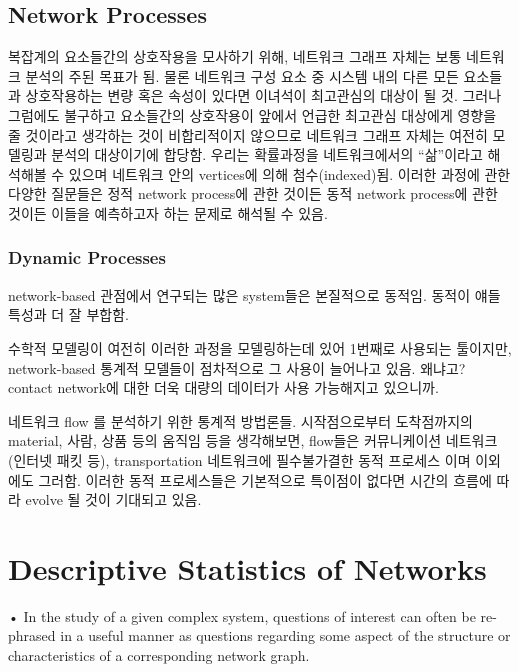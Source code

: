 \documentclass[
]{book}
\begin{document}
{{{\hypertarget{network-processes}{%
\subsection{Network Processes}\label{network-processes}}

복잡계의 요소들간의 상호작용을 모사하기 위해, 네트워크 그래프 자체는 보통 네트워크 분석의 주된 목표가 됨. 물론 네트워크 구성 요소 중 시스템 내의 다른 모든 요소들과 상호작용하는 변량 혹은 속성이 있다면 이녀석이 최고관심의 대상이 될 것. 그러나 그럼에도 불구하고 요소들간의 상호작용이 앞에서 언급한 최고관심 대상에게 영향을 줄 것이라고 생각하는 것이 비합리적이지 않으므로 네트워크 그래프 자체는 여전히 모델링과 분석의 대상이기에 합당함. 우리는 확률과정을 네트워크에서의 ``삶''이라고 해석해볼 수 있으며 네트워크 안의 vertices에 의해 첨수(indexed)됨. 이러한 과정에 관한 다양한 질문들은 정적 network process에 관한 것이든 동적 network process에 관한 것이든 이들을 예측하고자 하는 문제로 해석될 수 있음.

\hypertarget{dynamic-processes}{%
\subsubsection{Dynamic Processes}\label{dynamic-processes}}

network-based 관점에서 연구되는 많은 system들은 본질적으로 동적임. 동적이 얘들 특성과 더 잘 부합함.

수학적 모델링이 여전히 이러한 과정을 모델링하는데 있어 1번째로 사용되는 툴이지만, network-based 통계적 모델들이 점차적으로 그 사용이 늘어나고 있음. 왜냐고? contact network에 대한 더욱 대량의 데이터가 사용 가능해지고 있으니까.

네트워크 flow 를 분석하기 위한 통계적 방법론들. 시작점으로부터 도착점까지의 material, 사람, 상품 등의 움직임 등을 생각해보면, flow들은 커뮤니케이션 네트워크 (인터넷 패킷 등), transportation 네트워크에 필수불가결한 동적 프로세스 이며 이외에도 그러함. 이러한 동적 프로세스들은 기본적으로 특이점이 없다면 시간의 흐름에 따라 evolve 될 것이 기대되고 있음.

\hypertarget{descriptive-statistics-of-networks}{%
\section{Descriptive Statistics of Networks}\label{descriptive-statistics-of-networks}}

• In the study of a given complex system, questions of interest can often be re-phrased in a useful manner as questions regarding some aspect of the structure or characteristics of a corresponding network graph.

}}}
\end{document}
